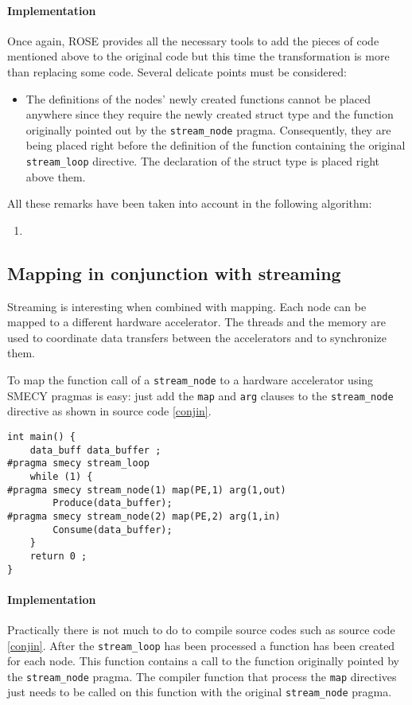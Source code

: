 \documentclass [A4]{article}
\begin{document}
	\paragraph{Implementation} Once again, ROSE provides all the necessary tools to add the pieces of code mentioned above to the original code but this time the transformation is more than replacing some code. Several delicate points must be considered:
	\begin{itemize}
		\item The definitions of the nodes' newly created functions cannot be placed anywhere since they require the newly created struct type and the function originally pointed out by the \verb+stream_node+ pragma. Consequently, they are being placed right before the definition of the function containing the original \verb+stream_loop+ directive. The declaration of the struct type is placed right above them.
	\end{itemize}
	
	All these remarks have been taken into account in the following algorithm:
	\begin{enumerate}
		\item
	\end{enumerate}
	
	\subsection{Mapping in conjunction with streaming}
	Streaming is interesting when combined with mapping. Each node can be mapped to a different hardware accelerator. The threads and the memory are used to coordinate data transfers between the accelerators and to synchronize them.
	
	To map the function call of a \verb+stream_node+ to a hardware accelerator using SMECY pragmas is easy: just add the \verb+map+ and \verb+arg+ clauses to the \verb+stream_node+ directive as shown in source code \ref{conjin}.
		
	\begin{lstlisting}[label=conjin,caption={Input code with streaming and mapping pragmas. Definitions of functions \texttt{Produce} and \texttt{Consume} are not shown.}]
int main() {
	data_buff data_buffer ;
#pragma smecy stream_loop
	while (1) {
#pragma smecy stream_node(1) map(PE,1) arg(1,out)
		Produce(data_buffer);
#pragma smecy stream_node(2) map(PE,2) arg(1,in)
		Consume(data_buffer);
	}
	return 0 ;
}
	\end{lstlisting}
	
	\paragraph{Implementation} Practically there is not much to do to compile source codes such as source code \ref{conjin}. After the \verb+stream_loop+ has been processed a function has been created for each node. This function contains a call to the function originally pointed by the \verb+stream_node+ pragma. The compiler function that process the \verb+map+ directives just needs to be called on this function with the original \verb+stream_node+ pragma.
\end{document}
